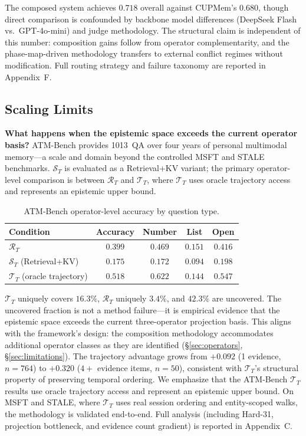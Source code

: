 \documentclass[letterpaper,twocolumn,10pt]{article}
\begin{document}
The composed system achieves $0.718$ overall against CUPMem's $0.680$, though direct comparison is confounded by backbone model differences (DeepSeek Flash vs.\ GPT-4o-mini) and judge methodology. The structural claim is independent of this number: composition gains follow from operator complementarity, and the phase-map-driven methodology transfers to external conflict regimes without modification. Full routing strategy and failure taxonomy are reported in Appendix~F.

\subsection{Scaling Limits}
\label{sec:atmscaling}
\textbf{What happens when the epistemic space exceeds the current operator basis?} ATM-Bench \cite{mei2026atmbench} provides 1013~QA over four years of personal multimodal memory---a scale and domain beyond the controlled MSFT and STALE benchmarks. $\mathcal{S}_T$ is evaluated as a Retrieval+KV variant; the primary operator-level comparison is between $\mathcal{R}_T$ and $\mathcal{T}_T$, where $\mathcal{T}_T$ uses oracle trajectory access and represents an epistemic upper bound.

\begin{table}[t]
\centering\small
\caption{ATM-Bench operator-level accuracy by question type.}
\begin{tabular}{lcccc}
\toprule
Condition & Accuracy & Number & List & Open \\
\midrule
$\mathcal{R}_T$ & $0.399$ & $0.469$ & $0.151$ & $0.416$ \\
$\mathcal{S}_T$ (Retrieval+KV) & $0.175$ & $0.172$ & $0.094$ & $0.198$ \\
$\mathcal{T}_T$ (oracle trajectory) & $\mathbf{0.518}$ & $0.622$ & $0.144$ & $0.547$ \\
\bottomrule
\end{tabular}
\end{table}

$\mathcal{T}_T$ uniquely covers $16.3\%$, $\mathcal{R}_T$ uniquely $3.4\%$, and $42.3\%$ are uncovered. The uncovered fraction is not a method failure---it is empirical evidence that the epistemic space exceeds the current three-operator projection basis. This aligns with the framework's design: the composition methodology accommodates additional operator classes as they are identified (\S\ref{sec:operators}, \S\ref{sec:limitations}). The trajectory advantage grows from $+0.092$ (1 evidence, $n=764$) to $+0.320$ ($4+$ evidence items, $n=50$), consistent with $\mathcal{T}_T$'s structural property of preserving temporal ordering. We emphasize that the ATM-Bench $\mathcal{T}_T$ results use oracle trajectory access and represent an epistemic upper bound. On MSFT and STALE, where $\mathcal{T}_T$ uses real session ordering and entity-scoped walks, the methodology is validated end-to-end. Full analysis (including Hard-31, projection bottleneck, and evidence count gradient) is reported in Appendix~C.
\end{document}
